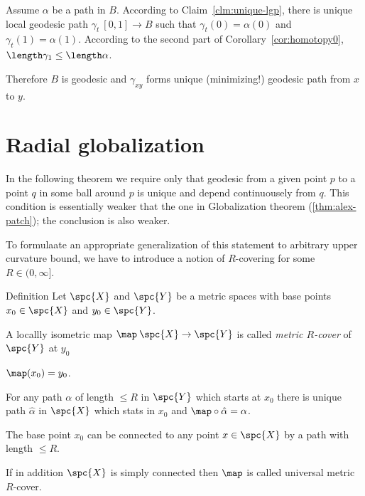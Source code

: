 Assume $\alpha$ be a path in $B$.
According to Claim~\ref{clm:unique-lgp},
there is unique 
local geodesic path $\gamma_t\:[0,1]\to B$ such that $\gamma_t(0)=\alpha(0)$ and $\gamma_t(1)=\alpha(1)$.
According to the second part of Corollary~\ref{cor:homotopy0}, $\length\gamma_1\le\length\alpha$.

Therefore $B$ is geodesic and  $\gamma_{xy}$ forms 
unique (minimizing!) geodesic path from $x$ to $y$.













\section{Radial globalization}

In the following theorem we require only that geodesic from a given point $p$ to a point $q$ in some ball around $p$ is unique and depend continuousely from $q$.
This condition is essentially weaker that the one in Globalization theorem (\ref{thm:alex-patch}); the conclusion is also weaker. 











To formulaate an appropriate generalization of this statement to arbitrary upper curvature bound, we have to introduce a notion of $R$-covering for some $R\in (0,\infty]$.

\begin{thm}{Definition}\label{def:R-cover}
Let $\spc{X}$ and $\spc{Y}$ be a metric spaces with base points $x_0\in\spc{X}$ and $y_0\in\spc{Y}$.

A locallly isometric map $\map\:\spc{X}\to\spc{Y}$ is called 
\emph{metric $R$-cover}%
of $\spc{Y}$ at $y_0$ 

\begin{subthm}{}
$\map(x_0)=y_0$.
\end{subthm}

\begin{subthm}{}
For any path $\alpha$ of length $\le R$ in $\spc{Y}$ which starts at $x_0$ there is unique path $\hat\alpha$ in $\spc{X}$ which stats in $x_0$ and $\map\circ\hat\alpha=\alpha$.
\end{subthm}

\begin{subthm}{}
The base point $x_0$ can be connected to any point $x\in\spc{X}$ by a path with length $\le R$.
\end{subthm}

If in addition $\spc{X}$ is simply connected then $\map$ is called universal metric $R$-cover.
\end{thm}









